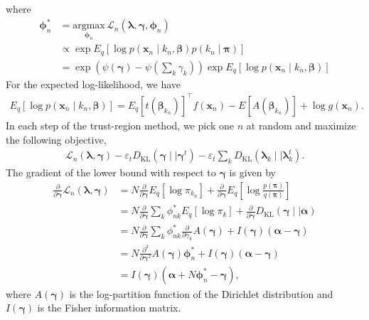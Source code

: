 \documentclass[a4paper]{article}
\begin{document}
		where
		\begin{align}
			\bm{\phi}_n^*
			&= \underset{\bm{\phi}_n}{\text{argmax}} \, \mathcal{L}_n(\bm{\lambda}, \bm{\gamma}, \bm{\phi}_n) \\
			&\propto \exp E_q\left[ \log p(\mathbf{x}_n \mid k_n, \bm{\beta}) p(k_n \mid \bm{\pi}) \right] \\
			&= \exp \left( \psi(\bm{\gamma}) - \psi\left(\sum_k \gamma_k\right) \right) \exp E_q\left[ \log p(\mathbf{x}_n \mid k_n, \bm{\beta}) \right]
		\end{align}
		For the expected log-likelihood, we have
		\begin{align}
			\label{eq:expected_loglikelihood}
			E_q\left[ \log p(\mathbf{x}_n \mid k_n, \bm{\beta}) \right]
			= E_q\left[ t(\bm{\beta}_{k_n})\right]^\top f(\mathbf{x}_n) - E\left[ A(\bm{\beta}_{k_n}) \right] + \log g(\mathbf{x}_n).
		\end{align}
		In each step of the trust-region method, we pick one $n$ at random and maximize the following objective,
		\begin{align}
			\label{eq:tr_obj}
			\mathcal{L}_n(\bm{\lambda}, \bm{\gamma}) - \varepsilon_t D_\text{KL}(\bm{\gamma} \mid\mid \bm{\gamma}^t) - \varepsilon_t \sum_k D_\text{KL}(\bm{\lambda}_k \mid\mid \bm{\lambda}_k^t).
		\end{align}
		The gradient of the lower bound with respect to $\bm{\gamma}$ is given by
		\begin{align}
			\frac{\partial}{\partial \bm{\gamma}} \mathcal{L}_n(\bm{\lambda}, \bm{\gamma})
			&= N \frac{\partial}{\partial \bm{\gamma}} E_q\left[ \log \pi_{k_n} \right]
			+ \frac{\partial}{\partial \bm{\gamma}} E_q\left[ \log \frac{p(\bm{\pi})}{q(\bm{\pi})} \right] \\
			&= N \frac{\partial}{\partial \bm{\gamma}} \sum_k \phi_{nk}^* E_q\left[ \log \pi_k \right]
			+ \frac{\partial}{\partial \bm{\gamma}} D_\text{KL}( \bm{\gamma} \mid\mid \bm{\alpha} ) \\
			&= N \frac{\partial}{\partial \bm{\gamma}} \sum_k \phi_{nk}^* \frac{\partial}{\partial \gamma_k} A(\bm{\gamma})
			+ I(\bm{\gamma}) (\bm{\alpha} - \bm{\gamma})  \\
			&= N \frac{\partial^2}{\partial \bm{\gamma}^2} A(\bm{\gamma}) \bm{\phi}_{n}^*
			+ I(\bm{\gamma}) (\bm{\alpha} - \bm{\gamma})  \\
			&= I(\bm{\gamma}) (\bm{\alpha} + N \bm{\phi}_{n}^* - \bm{\gamma}),
		\end{align}
		where $A(\bm{\gamma})$ is the log-partition function of the Dirichlet distribution and $I(\bm{\gamma})$ is the Fisher information matrix.
\end{document}
